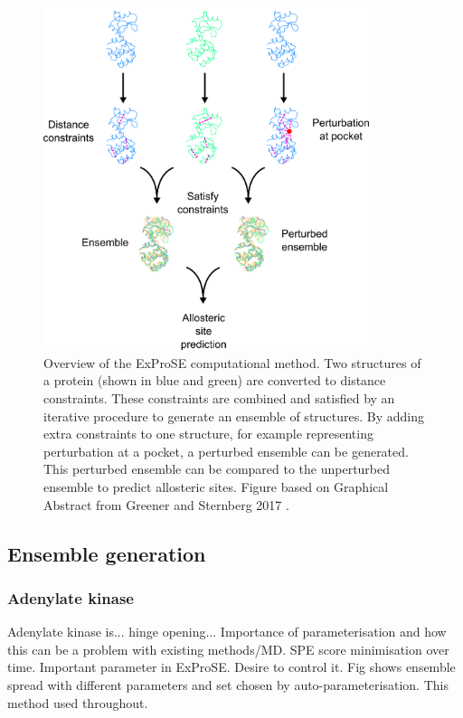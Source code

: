 \begin{figure}
\centering

\includegraphics[width=0.85\textwidth]{figures/exprose_overview/exprose_overview}

\caption{Overview of the ExProSE computational method.
Two structures of a protein (shown in blue and green) are converted to distance constraints.
These constraints are combined and satisfied by an iterative procedure to generate an ensemble of structures.
By adding extra constraints to one structure, for example representing perturbation at a pocket, a perturbed ensemble can be generated.
This perturbed ensemble can be compared to the unperturbed ensemble to predict allosteric sites.
Figure based on Graphical Abstract from Greener and Sternberg 2017 \cite{Greener2017}.}

\label{fig:exprose_overview}
\end{figure}


\subsection{Ensemble generation}

\subsubsection{Adenylate kinase}

Adenylate kinase is... hinge opening...
Importance of parameterisation and how this can be a problem with existing methods/MD.
SPE score minimisation over time.
Important parameter in ExProSE.
Desire to control it.
Fig shows ensemble spread with different parameters and set chosen by auto-parameterisation.
This method used throughout.

